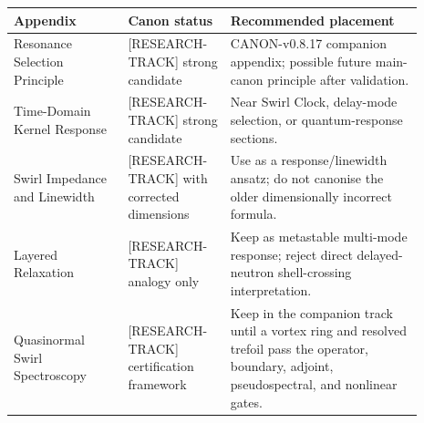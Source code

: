     \begin{center}
        \begin{tabular}{|p{0.25\linewidth}|p{0.22\linewidth}|p{0.42\linewidth}|}
            \hline
            \textbf{Appendix} & \textbf{Canon status} & \textbf{Recommended placement} \\
            \hline
            Resonance Selection Principle &
            [RESEARCH-TRACK] strong candidate &
            CANON-v0.8.17 companion appendix; possible future main-canon principle after validation. \\
            \hline
            Time-Domain Kernel Response &
            [RESEARCH-TRACK] strong candidate &
            Near Swirl Clock, delay-mode selection, or quantum-response sections. \\
            \hline
            Swirl Impedance and Linewidth &
            [RESEARCH-TRACK] with corrected dimensions &
            Use as a response/linewidth ansatz; do not canonise the older dimensionally incorrect formula. \\
            \hline
            Layered Relaxation &
            [RESEARCH-TRACK] analogy only &
            Keep as metastable multi-mode response; reject direct delayed-neutron shell-crossing interpretation. \\
            \hline
            Quasinormal Swirl Spectroscopy &
            [RESEARCH-TRACK] certification framework &
            Keep in the companion track until a vortex ring and resolved trefoil pass the operator, boundary, adjoint, pseudospectral, and nonlinear gates. \\
            \hline
        \end{tabular}
    \end{center}

